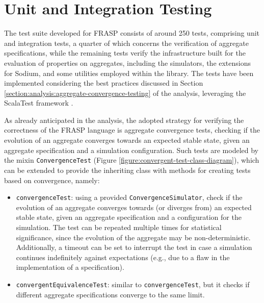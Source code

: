 
\section{Unit and Integration Testing}
\label{section:verification:unit-and-integration-testing}

The test suite developed for FRASP consists of around 250 tests, comprising
unit and integration tests, a quarter of which concerns the verification of
aggregate specifications, while the remaining tests verify the infrastructure
built for the evaluation of properties on aggregates, including the simulators,
the extensions for Sodium, and some utilities employed within the library. The
tests have been implemented considering the best practices discussed in Section
\ref{section:analysis:aggregate-convergence-testing} of the analysis,
leveraging the ScalaTest framework \cite{ScalaTest}.

As already anticipated in the analysis, the adopted strategy for verifying the
correctness of the FRASP language is aggregate convergence tests, checking if
the evolution of an aggregate converges towards an expected stable state, given
an aggregate specification and a simulation configuration. Such tests are
modeled by the mixin \texttt{ConvergenceTest} (Figure
\ref{figure:convergent-test-class-diagram}), which can be extended to provide
the inheriting class with methods for creating tests based on convergence,
namely:
\begin{itemize}
  \item \texttt{convergenceTest}: using a provided
        \texttt{ConvergenceSimulator}, check if the evolution of an aggregate
        converges towards (or diverges from) an expected stable state, given an
        aggregate specification and a configuration for the simulation. The
        test can be repeated multiple times for statistical significance, since
        the evolution of the aggregate may be non-deterministic. Additionally,
        a timeout can be set to interrupt the test in case a simulation
        continues indefinitely against expectations (e.g., due to a flaw in the
        implementation of a specification).
  \item \texttt{convergentEquivalenceTest}: similar to
        \texttt{convergenceTest}, but it checks if different aggregate
        specifications converge to the same limit.
\end{itemize}


